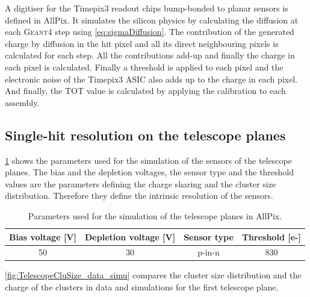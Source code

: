 A digitiser for the Timepix3 readout chips bump-bonded to planar
sensors is defined in AllPix. It simulates the silicon physics by
calculating the diffusion at each \textsc{Geant4} step using
\cref{eq:sigmaDiffusion}. The contribution of the generated charge by
diffusion in the hit pixel and all its direct neighbouring pixels is
calculated for each step. All the contributions add-up and finally the
charge in each pixel is calculated. Finally a threshold is applied to
each pixel and the electronic noise of the Timepix3 ASIC also adds up
to the charge in each pixel. And finally, the TOT value is calculated
by applying the calibration to each assembly.

\subsection{Single-hit resolution on the telescope planes}

\cref{tab:AllPixTelescopePlanesParams} shows the parameters used for
the simulation of the sensors of the telescope planes. The bias and
the depletion voltages, the sensor type and the threshold values are
the parameters defining the charge sharing and the cluster size
distribution. Therefore they define the intrinsic resolution of the
sensors.

\begin{table}[htbp]
  \centering
  \caption{Parameters used for the simulation of the telescope planes in AllPix.}
  \label{tab:AllPixTelescopePlanesParams}
  \begin{tabular}{cccc}
    \toprule
    Bias voltage [V] & Depletion voltage [V] & Sensor type & Threshold [e-] \\
    \midrule
    50 & 30 & p-in-n & 830 \\
    \bottomrule
  \end{tabular}
\end{table}


\cref{fig:TelescopeCluSize_data_simu} compares the cluster size
distribution and the charge of the clusters in data and simulations
for the first telescope plane.

